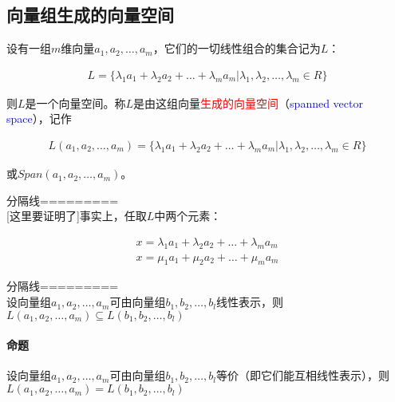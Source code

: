 \documentclass[UTF8]{ctexbook}
\begin{document}
\subsection{向量组生成的向量空间}

设有一组$m$维向量$a_{1},a_{2},\dots,a_{m}$，它们的一切线性组合的集合记为$L$：

\begin{equation}
\begin{aligned}
L=\{ \lambda_{1}a_{1}+\lambda_{2}a_{2}+\dots+\lambda_{m}a_{m} | \lambda_{1},\lambda_{2},\dots,\lambda_{m} \in R \}
\end{aligned}
\end{equation}

则$L$是一个向量空间。称$L$是由这组向量\textcolor{red}{生成的向量空间}（\textcolor{blue}{spanned vector space}），记作

\begin{equation}
\begin{aligned}
L(a_{1},a_{2},\dots,a_{m})=\{ \lambda_{1}a_{1}+\lambda_{2}a_{2}+\dots+\lambda_{m}a_{m} | \lambda_{1},\lambda_{2},\dots,\lambda_{m} \in R \}
\end{aligned}
\end{equation}

或$Span(a_{1},a_{2},\dots,a_{m})$。


分隔线=========\\

[这里要证明了]事实上，任取$L$中两个元素：

\begin{equation}
\begin{aligned}
x=\lambda_{1}a_{1}+\lambda_{2}a_{2}+\dots+\lambda_{m}a_{m}\\
x=\mu_{1}a_{1}+\mu_{2}a_{2}+\dots+\mu_{m}a_{m}
\end{aligned}
\end{equation}

分隔线=========\\

设向量组$a_{1},a_{2},\dots,a_{m}$可由向量组$b_{1},b_{2},\dots,b_{l}$线性表示，则$L(a_{1},a_{2},\dots,a_{m}) \subseteq L(b_{1},b_{2},\dots,b_{l})$

\paragraph{命题} 设向量组$a_{1},a_{2},\dots,a_{m}$可由向量组$b_{1},b_{2},\dots,b_{l}$等价（即它们能互相线性表示），则$L(a_{1},a_{2},\dots,a_{m}) = L(b_{1},b_{2},\dots,b_{l})$
\end{document}
